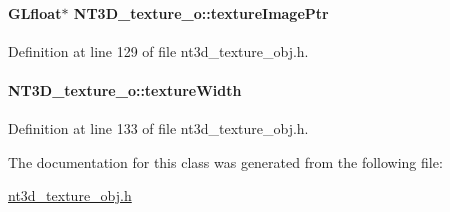 \paragraph[{textureImagePtr}]{\setlength{\rightskip}{0pt plus 5cm}GLfloat$\ast$ {\bf NT3D\_\-texture\_\-o::textureImagePtr}}\hfill\label{class_n_t3_d__texture__o_abbb78294ccb0650a5bd085c1d60d0759}


Definition at line 129 of file nt3d\_\-texture\_\-obj.h.

\paragraph[{textureWidth}]{ {\bf NT3D\_\-texture\_\-o::textureWidth}}\hfill\label{class_n_t3_d__texture__o_acb9b5da794cfd769b64ced6ecd57d5ee}


Definition at line 133 of file nt3d\_\-texture\_\-obj.h.



The documentation for this class was generated from the following file:\begin{DoxyCompactItemize}
\item 
\hyperlink{nt3d__texture__obj_8h}{nt3d\_\-texture\_\-obj.h}\end{DoxyCompactItemize}
